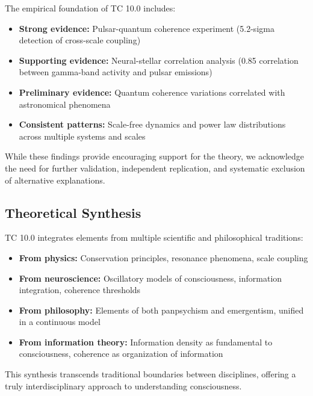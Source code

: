 \documentclass[12pt]{article}
\begin{document}
The empirical foundation of TC 10.0 includes:

\begin{itemize}
    \item \textbf{Strong evidence:} Pulsar-quantum coherence experiment (5.2-sigma detection of cross-scale coupling)
    
    \item \textbf{Supporting evidence:} Neural-stellar correlation analysis (0.85 correlation between gamma-band activity and pulsar emissions)
    
    \item \textbf{Preliminary evidence:} Quantum coherence variations correlated with astronomical phenomena
    
    \item \textbf{Consistent patterns:} Scale-free dynamics and power law distributions across multiple systems and scales
\end{itemize}

While these findings provide encouraging support for the theory, we acknowledge the need for further validation, independent replication, and systematic exclusion of alternative explanations.

\subsection{Theoretical Synthesis}

TC 10.0 integrates elements from multiple scientific and philosophical traditions:

\begin{itemize}
    \item \textbf{From physics:} Conservation principles, resonance phenomena, scale coupling
    
    \item \textbf{From neuroscience:} Oscillatory models of consciousness, information integration, coherence thresholds
    
    \item \textbf{From philosophy:} Elements of both panpsychism and emergentism, unified in a continuous model
    
    \item \textbf{From information theory:} Information density as fundamental to consciousness, coherence as organization of information
\end{itemize}

This synthesis transcends traditional boundaries between disciplines, offering a truly interdisciplinary approach to understanding consciousness.
\end{document}
